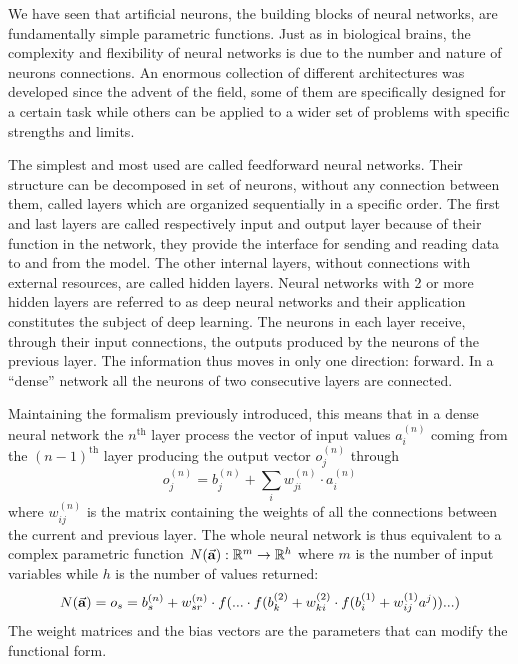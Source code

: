 \documentclass[a4paper,10pt]{report}
\begin{document}

We have seen that artificial neurons, the building blocks of neural networks,
are fundamentally simple parametric functions.
Just as in biological brains, the complexity and flexibility
of neural networks is due to the number and nature of neurons connections.
An enormous collection of different architectures was developed since the advent of the field,
some of them are specifically designed for a certain task while others can be applied
to a wider set of problems with specific strengths and limits.

The simplest and most used are called feedforward neural networks.
Their structure can be decomposed in set of neurons, without any connection between them, called layers which are
organized sequentially in a specific order.
The first and last layers are called respectively input and output layer because of
their function in the network, they provide the interface for sending and reading data to and from 
the model. The other internal layers, without connections with external resources, are called hidden layers.
Neural networks with 2 or more hidden layers are referred to as deep neural networks and their
application constitutes the subject of deep learning.
The neurons in each layer receive, through their input connections,
the outputs produced by the neurons of the previous layer.  The information thus moves in
only one direction: forward. In a ``dense'' network all the neurons of two consecutive layers
are connected.

Maintaining the formalism previously introduced, this means that in a dense 
neural network the $n^{\text{th}}$ layer process the vector of input values 
$a_i^{(n)}$ coming from the $(n-1)^{\text{th}}$ layer producing the output vector $o_j^{(n)}$ through
\begin{equation}
    o_j^{(n)} = b_j^{(n)} + \sum_i w^{(n)}_{ji}\cdot a^{(n)}_i
\end{equation}
where $w^{(n)}_{ij}$ is the matrix containing the weights of all the connections between the current and previous layer.
The whole neural network is thus equivalent to a complex parametric function $N (\va a): \mathbb{R}^m \rightarrow \mathbb{R}^h$ where $m$ is 
the number of input variables while $h$ is the number of values returned:
\begin{equation}
    N(\va a) = o_s = b_s^{(n)} + w^{(n)}_{sr} 
    \cdot f( ... \cdot f( b_k^{(2)} + w_{ki}^{(2)} \cdot f(b_i^{(1)} + w_{ij}^{(1)}a^j)) ... )
\end{equation}
The weight matrices and the bias vectors are the parameters that can modify the functional form.
\end{document}
